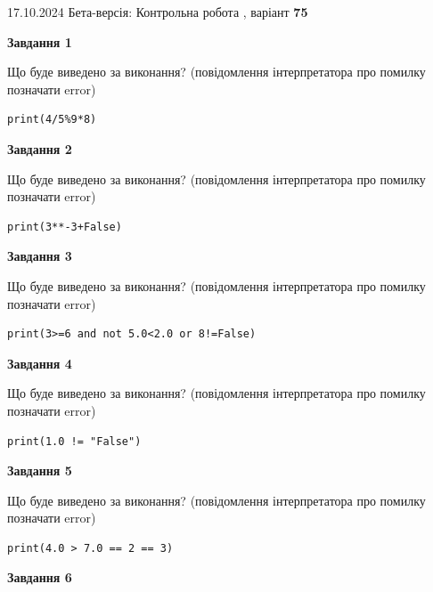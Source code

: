 \documentclass[12pt, ukrainian]{article}
\begin{document}
{\Large{17.10.2024 Бета-версія: Контрольна робота , варіант  \No \textbf { 75 }\par}}
{
\begin {large}
{\begin {center}\textbf{Завдання 1}\end {center}}

Що буде виведено за виконання? (повідомлення інтерпретатора про помилку позначати error)\par
\begin{verbatim}
print(4/5%9*8)
\end{verbatim}

{\begin {center}\textbf{Завдання 2}\end {center}}

Що буде виведено за виконання? (повідомлення інтерпретатора про помилку позначати error)\par
\begin{verbatim}
print(3**-3+False)
\end{verbatim}

{\begin {center}\textbf{Завдання 3}\end {center}}

Що буде виведено за виконання? (повідомлення інтерпретатора про помилку позначати error)\par
\begin{verbatim}
print(3>=6 and not 5.0<2.0 or 8!=False)
\end{verbatim}

{\begin {center}\textbf{Завдання 4}\end {center}}

Що буде виведено за виконання? (повідомлення інтерпретатора про помилку позначати error)\par
\begin{verbatim}
print(1.0 != "False")
\end{verbatim}

{\begin {center}\textbf{Завдання 5}\end {center}}

Що буде виведено за виконання? (повідомлення інтерпретатора про помилку позначати error)\par
\begin{verbatim}
print(4.0 > 7.0 == 2 == 3)
\end{verbatim}

{\begin {center}\textbf{Завдання 6}\end {center}}


\end{large}}
\end{document}
